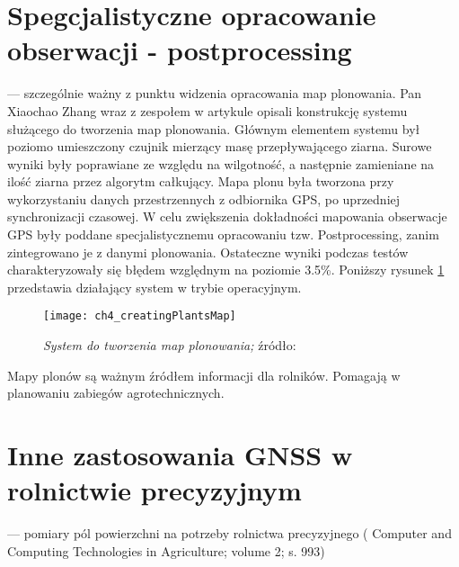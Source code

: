 \section{Spegcjalistyczne opracowanie obserwacji - postprocessing}
--- szczególnie ważny z punktu widzenia opracowania map plonowania.
Pan Xiaochao Zhang wraz z zespołem w artykule \cite{CCTA_951_958} opisali konstrukcję systemu służącego do tworzenia map plonowania.
Głównym elementem systemu był poziomo umieszczony czujnik mierzący masę przepływającego ziarna.
Surowe wyniki były poprawiane ze względu na wilgotność, a następnie zamieniane na ilość ziarna przez algorytm całkujący.
Mapa plonu była tworzona przy wykorzystaniu danych przestrzennych z odbiornika GPS, po uprzedniej synchronizacji czasowej.
W celu zwiększenia dokładności mapowania obserwacje GPS były poddane specjalistycznemu opracowaniu tzw. Postprocessing,
zanim zintegrowano je z danymi plonowania. Ostateczne wyniki podczas testów charakteryzowały się błędem względnym na poziomie 3.5\%. 
Poniższy rysunek \ref{fig:ch4_creatingPlantsMap} przedstawia działający system w trybie operacyjnym.
\begin{figure}[H]
\centering
\texttt{[image: ch4\_creatingPlantsMap]}
\caption{\textit{System do tworzenia map plonowania;} źródło: \cite[][strona 954]{CCTA_951_958}}
\label{fig:ch4_creatingPlantsMap}
\end{figure}
Mapy plonów są ważnym źródłem informacji dla rolników. Pomagają w planowaniu zabiegów agrotechnicznych.

\section{Inne zastosowania GNSS w rolnictwie precyzyjnym}
--- pomiary pól powierzchni na potrzeby rolnictwa precyzyjnego
	( Computer and Computing Technologies in Agriculture; volume 2; s. 993)

